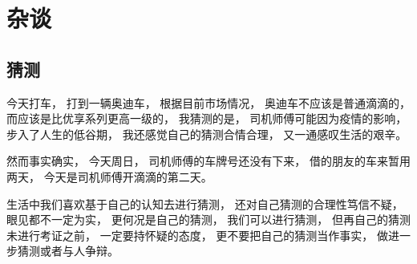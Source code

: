 
\chapter{杂谈}

\section{猜测}


今天打车，
打到一辆奥迪车，
根据目前市场情况，
奥迪车不应该是普通滴滴的，
而应该是比优享系列更高一级的，
我猜测的是，
司机师傅可能因为疫情的影响，
步入了人生的低谷期，
我还感觉自己的猜测合情合理，
又一通感叹生活的艰辛。

然而事实确实，
今天周日，
司机师傅的车牌号还没有下来，
借的朋友的车来暂用两天，
今天是司机师傅开滴滴的第二天。


生活中我们喜欢基于自己的认知去进行猜测，
还对自己猜测的合理性笃信不疑，
眼见都不一定为实，
更何况是自己的猜测，
我们可以进行猜测，
但再自己的猜测未进行考证之前，
一定要持怀疑的态度，
更不要把自己的猜测当作事实，
做进一步猜测或者与人争辩。